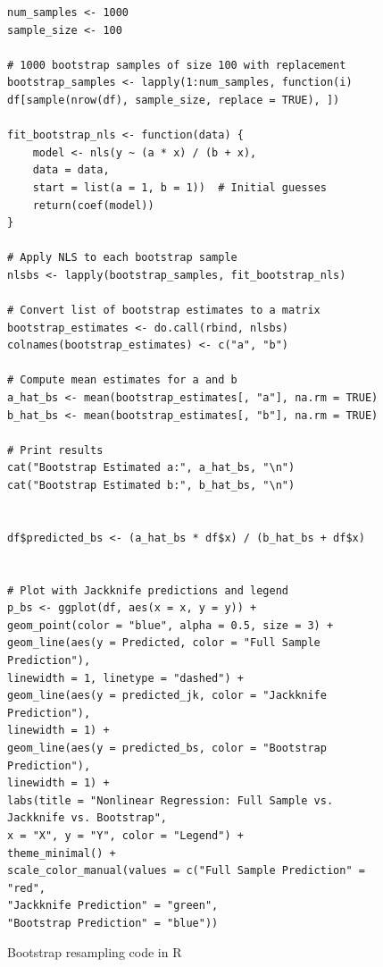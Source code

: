 \documentclass[]{article}
\begin{document}
\begin{figure}[H]
	\captionsetup{type=lstlisting}
	\begin{lstlisting}
num_samples <- 1000
sample_size <- 100

# 1000 bootstrap samples of size 100 with replacement
bootstrap_samples <- lapply(1:num_samples, function(i) df[sample(nrow(df), sample_size, replace = TRUE), ])

fit_bootstrap_nls <- function(data) {
	model <- nls(y ~ (a * x) / (b + x),
	data = data,
	start = list(a = 1, b = 1))  # Initial guesses
	return(coef(model))
}

# Apply NLS to each bootstrap sample
nlsbs <- lapply(bootstrap_samples, fit_bootstrap_nls)

# Convert list of bootstrap estimates to a matrix
bootstrap_estimates <- do.call(rbind, nlsbs)
colnames(bootstrap_estimates) <- c("a", "b")

# Compute mean estimates for a and b
a_hat_bs <- mean(bootstrap_estimates[, "a"], na.rm = TRUE)
b_hat_bs <- mean(bootstrap_estimates[, "b"], na.rm = TRUE)

# Print results
cat("Bootstrap Estimated a:", a_hat_bs, "\n")
cat("Bootstrap Estimated b:", b_hat_bs, "\n")


df$predicted_bs <- (a_hat_bs * df$x) / (b_hat_bs + df$x)


# Plot with Jackknife predictions and legend
p_bs <- ggplot(df, aes(x = x, y = y)) +
geom_point(color = "blue", alpha = 0.5, size = 3) +
geom_line(aes(y = Predicted, color = "Full Sample Prediction"),
linewidth = 1, linetype = "dashed") +
geom_line(aes(y = predicted_jk, color = "Jackknife Prediction"),
linewidth = 1) +
geom_line(aes(y = predicted_bs, color = "Bootstrap Prediction"),
linewidth = 1) +
labs(title = "Nonlinear Regression: Full Sample vs. Jackknife vs. Bootstrap",
x = "X", y = "Y", color = "Legend") +
theme_minimal() +
scale_color_manual(values = c("Full Sample Prediction" = "red",
"Jackknife Prediction" = "green",
"Bootstrap Prediction" = "blue"))
	\end{lstlisting}
	\caption{Bootstrap resampling code in R}
	\label{lst:bs}
\end{figure}
\end{document}
